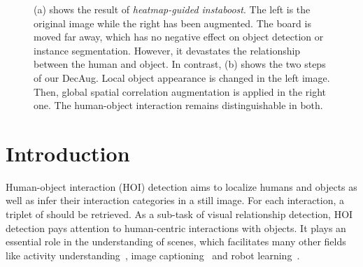 \documentclass[10pt,twocolumn,letterpaper]{article}
\begin{document}
\begin{figure}[t]
\centering
{}

\caption{(a) shows the result of \textit{heatmap-guided instaboost}. The left is the original image while the right has been augmented. The board is moved far away, which has no negative effect on object detection or instance segmentation. However, it devastates the relationship between the human and object. In contrast, (b) shows the two steps of our DecAug. Local object appearance is changed in the left image. Then, global spatial correlation augmentation is applied in the right one. The human-object interaction remains distinguishable in both.
}
\label{fig:drawback}
\end{figure}

\section{Introduction}
Human-object interaction (HOI) detection aims to localize humans and objects as well as infer their interaction categories in a still image. For each interaction, a triplet of  should be retrieved. As a sub-task of visual relationship detection, HOI detection pays attention to human-centric interactions with objects. It plays an essential role in the understanding of scenes, which facilitates many other fields like activity understanding~\cite{caba2015activitynet},  image captioning~\cite{li2017scene} and robot learning~\cite{argall2009survey}.
\end{document}
